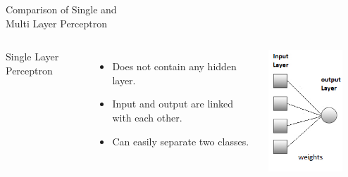 \documentclass[aspectratio=169,13pt,usenames,dvipsnames]{beamer}
\begin{document}
\begin{frame}{ Comparison of Single and 
	\\ Multi Layer Perceptron }
\begin{columns}
\alert{Single Layer Perceptron}
\begin{itemize}
  \item Does not contain any hidden layer.
  \item Input and output are linked with each other.
  \item Can easily separate two classes.
\end{itemize}
\includegraphics[width=0.8\textwidth, height=0.6\textheight]{Images/AIML_MLP_IMG2.jpg}
\end{columns}
\end{frame}
\end{document}
